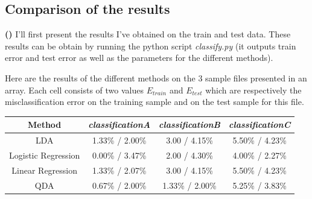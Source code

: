 \documentclass[a4paper, 11pt]{article}
\newcounter{cquestion}[subsection]
\renewcommand{\thecquestion}{\alph{cquestion}}
\newenvironment{question}
{\par \vspace{0.5em} \noindent \stepcounter{cquestion} \hspace{-1em}
 \textbf{(\thecquestion)}}
{}
\newcommand{\file}[1]{\emph{#1}}
\newcommand{\colgood}[1]{\color{ForestGreen} #1}
\begin{document}

\subsection{Comparison of the results}

\begin{question}
  I'll first present the results I've obtained on the train and
  test data.  These results can be obtain by running the python
  script \file{classify.py} (it outputs train error and test error
  as well as the parameters for the different methods).

  Here are the results of the different methods on the 3 sample files
  presented in an array. Each cell consists of two values $E_{train}$ and
  $E_{test}$ which are respectively the misclassification error on the training
  sample and on the test sample for this file.

\begin{table}[h!]
    \centering
    \begin{tabular}{| c | c | c | c |}
      \hline
      Method & \file{classificationA} & \file{classificationB} & \file{classificationC}\\
      \hline
      LDA                 & \colgood{1.33\% / 2.00\%} & 3.00 / 4.15\%           & 5.50\% / 4.23\% \\
      Logistic Regression & 0.00\% / 3.47\%           & 2.00 / 4.30\%           & \colgood{4.00\% / 2.27\%} \\
      Linear Regression   & 1.33\% / 2.07\%           & 3.00 / 4.15\%           & 5.50\% / 4.23\% \\
      QDA                 & 0.67\% / 2.00\%           & \colgood{1.33\% / 2.00\%} & 5.25\% / 3.83\% \\
      \hline
    \end{tabular}
     \label{tab:ErrorAll}
  \end{table}

\end{question}
\end{document}
